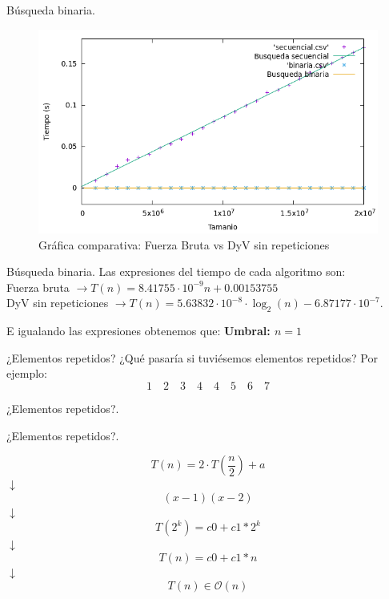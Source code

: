 \documentclass[10pt, xcolor=table]{beamer}
\begin{document}
\begin{frame}[fragile]{Búsqueda binaria. }
	\begin{figure}[h!]
		\centering
		\includegraphics[scale=0.45]{./Images/Grafica_secvsbin.png}
		\caption{Gráfica comparativa: Fuerza Bruta vs DyV sin repeticiones}
	\end{figure}
\end{frame}

\begin{frame}[fragile]{Búsqueda binaria. }
Las expresiones del tiempo de cada algoritmo son:\\

 Fuerza bruta \(\longrightarrow T(n) = 8.41755 \cdot 10^{-9} n + 0.00153755\) \\
 DyV sin repeticiones \(\longrightarrow T(n) = 5.63832 \cdot 10^{-8} \cdot \log_{2}(n) - 6.87177 \cdot 10^{-7}\).

E igualando las expresiones obtenemos que: 
 \textbf{Umbral: \(n = 1\)}

\end{frame}

\begin{frame}[fragile]{¿Elementos repetidos?}
¿Qué pasaría si tuviésemos elementos repetidos? Por ejemplo:
\[
	1 \quad 2 \quad 3 \quad 4 \quad 4 \quad 5 \quad 6 \quad 7
\]
\end{frame}

\begin{frame}[fragile]{¿Elementos repetidos?. }

\end{frame}

\begin{frame}[fragile]{¿Elementos repetidos?. }
	
\[
T(n) = 2 \cdot T \left( \frac{n}{2} \right) + a
\]
\centering \(\downarrow\)
\[
(x-1)(x-2)
\]
\centering \(\downarrow\)
\[
T(2^k) = c0 + c1*2^k
\]
\centering \(\downarrow\)
\[
T(n) = c0 + c1*n
\]
\centering \(\downarrow\)
\[
T(n) \in \mathcal{O}(n)
\]

\end{frame}
\end{document}
